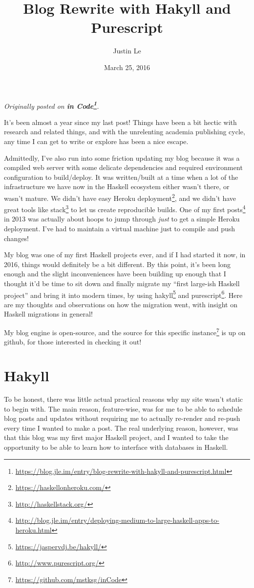 \documentclass[]{article}
\title{Blog Rewrite with Hakyll and Purescript}
\author{Justin Le}
\date{March 25, 2016}
\renewcommand{\href}[2]{#2\footnote{\url{#1}}}
\begin{document}
\maketitle

\emph{Originally posted on
\textbf{\href{https://blog.jle.im/entry/blog-rewrite-with-hakyll-and-purescript.html}{in
Code}}.}

It's been almost a year since my last post! Things have been a bit hectic with
research and related things, and with the unrelenting academia publishing cycle,
any time I can get to write or explore has been a nice escape.

Admittedly, I've also run into some friction updating my blog because it was a
compiled web server with some delicate dependencies and required environment
configuration to build/deploy. It was written/built at a time when a lot of the
infrastructure we have now in the Haskell ecosystem either wasn't there, or
wasn't mature. We didn't have easy \href{https://haskellonheroku.com/}{Heroku
deployment}, and we didn't have great tools like
\href{http://haskellstack.org/}{stack} to let us create reproducible builds. One
of my
\href{http://blog.jle.im/entry/deploying-medium-to-large-haskell-apps-to-heroku.html}{first
posts} in 2013 was actually about hoops to jump through \emph{just} to get a
simple Heroku deployment. I've had to maintain a virtual machine just to compile
and push changes!

My blog was one of my first Haskell projects ever, and if I had started it now,
in 2016, things would definitely be a bit different. By this point, it's been
long enough and the slight inconveniences have been building up enough that I
thought it'd be time to sit down and finally migrate my ``first large-ish
Haskell project'' and bring it into modern times, by using
\href{https://jaspervdj.be/hakyll/}{hakyll} and
\href{http://www.purescript.org/}{purescript}. Here are my thoughts and
observations on how the migration went, with insight on Haskell migrations in
general!

My blog engine is open-source, and the
\href{https://github.com/mstksg/inCode}{source for this specific instance} is up
on github, for those interested in checking it out!

\hypertarget{hakyll}{%
\section{Hakyll}\label{hakyll}}

To be honest, there was little actual practical reasons why my site wasn't
static to begin with. The main reason, feature-wise, was for me to be able to
schedule blog posts and updates without requiring me to actually re-render and
re-push every time I wanted to make a post. The real underlying reason, however,
was that this blog was my first major Haskell project, and I wanted to take the
opportunity to be able to learn how to interface with databases in Haskell.
\end{document}
